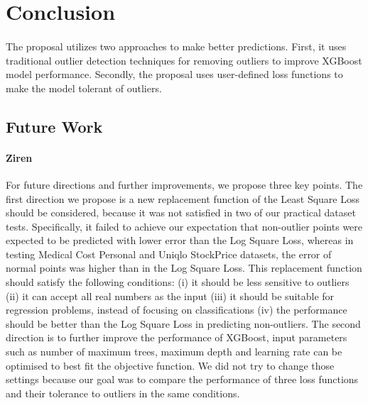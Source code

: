 \documentclass[runningheads]{llncs}
\begin{document}
\section{Conclusion}
\paragraph{} The proposal utilizes two approaches to make better predictions. First, it uses traditional outlier detection techniques for removing outliers to improve XGBoost model performance. Secondly, the proposal uses user-defined loss functions to make the model tolerant of outliers.


\subsection{Future Work}

\paragraph{Ziren}For future directions and further improvements, we propose three key points. The first direction we propose is a new replacement function of the Least Square Loss should be considered, because it was not satisfied in two of our practical dataset tests. Specifically, it failed to achieve our expectation that non-outlier points were expected to be predicted with lower error than the Log Square Loss, whereas in testing Medical Cost Personal and Uniqlo StockPrice datasets, the error of normal points was higher than in the Log Square Loss. This replacement function should satisfy the following conditions: (i) it should be less sensitive to outliers (ii) it can accept all real numbers as the input (iii) it should be suitable for regression problems, instead of focusing on classifications (iv) the performance should be better than the Log Square Loss in predicting non-outliers. The second direction is to further improve the performance of XGBoost, input parameters such as number of maximum trees, maximum depth and learning rate can be optimised to best fit the objective function. We did not try to change those settings because our goal was to compare the performance of three loss functions and their tolerance to outliers in the same conditions. 




%
%

%
%
%
% 
% 
%
\end{document}
